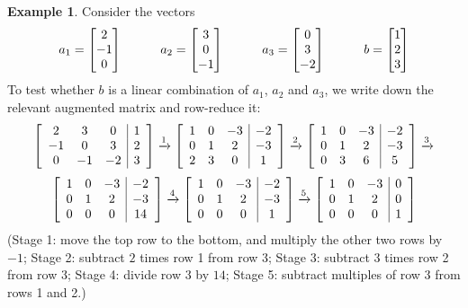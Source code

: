 \documentclass[reqno]{amsart}
\theoremstyle{definition}
\newtheorem{example}[theorem]{Example}
\begin{document}
\begin{example}\label{eg-find-lincomb-ii}
 Consider the vectors
 \[ a_1 = \left[\begin{matrix} 2 \\ -1 \\  0 \end{matrix}\right] \hspace{3em}
    a_2 = \left[\begin{matrix} 3 \\  0 \\ -1 \end{matrix}\right] \hspace{3em}
    a_3 = \left[\begin{matrix} 0 \\  3 \\ -2 \end{matrix}\right] \hspace{3em}
    b = \left[\begin{matrix} 1 \\ 2 \\ 3 \end{matrix}\right]
 \]
 To test whether $b$ is a linear combination of $a_1$, $a_2$ and
 $a_3$, we write down the relevant augmented matrix and row-reduce it:
 \[
  \left[\begin{array}{ccc|c}
    2 &  3 &  0 & 1 \\
   -1 &  0 &  3 & 2 \\
    0 & -1 & -2 & 3
  \end{array}\right]
  \xrightarrow{1}
  \left[\begin{array}{ccc|c}
    1 &  0 & -3 & -2 \\
    0 &  1 &  2 & -3 \\
    2 &  3 &  0 &  1
  \end{array}\right]
  \xrightarrow{2}
  \left[\begin{array}{ccc|c}
    1 &  0 & -3 & -2 \\
    0 &  1 &  2 & -3 \\
    0 &  3 &  6 &  5
  \end{array}\right]
  \xrightarrow{3}
 \] \[
  \left[\begin{array}{ccc|c}
    1 &  0 & -3 & -2 \\
    0 &  1 &  2 & -3 \\
    0 &  0 &  0 & 14
  \end{array}\right]
  \xrightarrow{4}
  \left[\begin{array}{ccc|c}
    1 &  0 & -3 & -2 \\
    0 &  1 &  2 & -3 \\
    0 &  0 &  0 &  1
  \end{array}\right]
  \xrightarrow{5}
  \left[\begin{array}{ccc|c}
    1 &  0 & -3 &  0 \\
    0 &  1 &  2 &  0 \\
    0 &  0 &  0 &  1
  \end{array}\right]
 \]
 (Stage 1: move the top row to the bottom, and multiply the other two rows
 by $-1$; Stage 2: subtract $2$ times row 1 from row 3; Stage 3:
 subtract $3$ times row 2 from row 3; Stage 4: divide row 3 by $14$;
 Stage 5: subtract multiples of row 3 from rows 1 and 2.)


\end{example}
\end{document}

